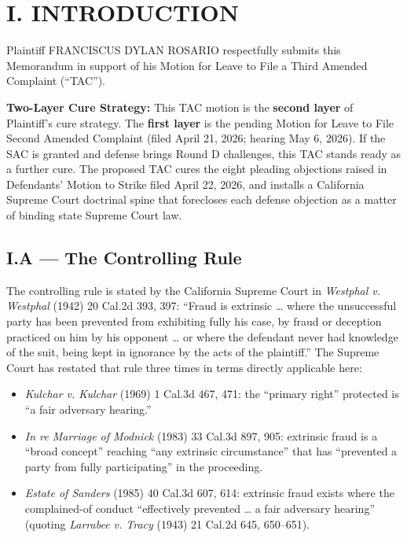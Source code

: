 \section{I. INTRODUCTION}\label{i.-introduction}

Plaintiff FRANCISCUS DYLAN ROSARIO respectfully submits this Memorandum in support of his Motion for Leave to File a Third Amended Complaint (``TAC'').

\textbf{Two-Layer Cure Strategy:} This TAC motion is the \textbf{second layer} of Plaintiff's cure strategy. The \textbf{first layer} is the pending Motion for Leave to File Second Amended Complaint (filed April 21, 2026; hearing May 6, 2026). If the SAC is granted and defense brings Round D challenges, this TAC stands ready as a further cure. The proposed TAC cures the eight pleading objections raised in Defendants' Motion to Strike filed April 22, 2026, and installs a California Supreme Court doctrinal spine that forecloses each defense objection as a matter of binding state Supreme Court law.

\subsection{I.A --- The Controlling Rule}\label{i.a-the-controlling-rule}

The controlling rule is stated by the California Supreme Court in \emph{Westphal v. Westphal} (1942) 20 Cal.2d 393, 397: ``Fraud is extrinsic \ldots{} where the unsuccessful party has been prevented from exhibiting fully his case, by fraud or deception practiced on him by his opponent \ldots{} or where the defendant never had knowledge of the suit, being kept in ignorance by the acts of the plaintiff.'' The Supreme Court has restated that rule three times in terms directly applicable here:

\begin{itemize}
\tightlist
\item
  \emph{Kulchar v. Kulchar} (1969) 1 Cal.3d 467, 471: the ``primary right'' protected is ``a fair adversary hearing.''
\item
  \emph{In re Marriage of Modnick} (1983) 33 Cal.3d 897, 905: extrinsic fraud is a ``broad concept'' reaching ``any extrinsic circumstance'' that has ``prevented a party from fully participating'' in the proceeding.
\item
  \emph{Estate of Sanders} (1985) 40 Cal.3d 607, 614: extrinsic fraud exists where the complained-of conduct ``effectively prevented \ldots{} a fair adversary hearing'' (quoting \emph{Larrabee v. Tracy} (1943) 21 Cal.2d 645, 650--651).
\end{itemize}

